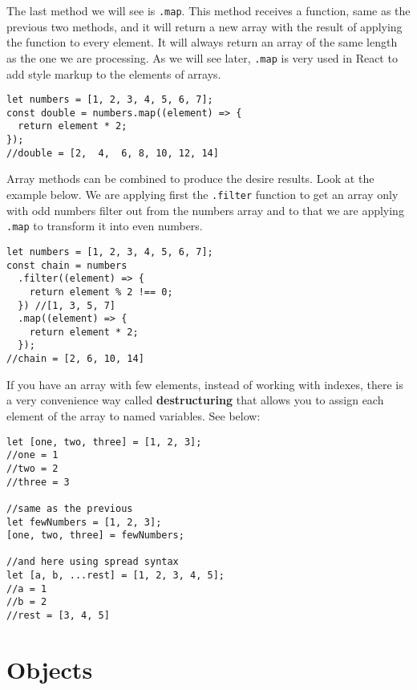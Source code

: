 \documentclass[a4paper, oneside, titlepage, 12pt]{book}
\begin{document}
The last method we will see is \texttt{.map}. This method receives a function, same as the previous two methods, and it will return a new array with the result of applying the function to every element. It will always return an array of the same length as the one we are processing. As we will see later, \texttt{.map} is very used in React to add style markup to the elements of arrays.

\begin{verbatim}
let numbers = [1, 2, 3, 4, 5, 6, 7];
const double = numbers.map((element) => {
  return element * 2;
});
//double = [2,  4,  6, 8, 10, 12, 14]
\end{verbatim}

Array methods can be combined to produce the desire results. Look at the example below. We are applying first the \texttt{.filter} function to get an array only with odd numbers filter out from the numbers array and to that we are applying \texttt{.map} to transform it into even numbers.

\begin{verbatim}
let numbers = [1, 2, 3, 4, 5, 6, 7];
const chain = numbers
  .filter((element) => {
    return element % 2 !== 0;
  }) //[1, 3, 5, 7]
  .map((element) => {
    return element * 2;
  });
//chain = [2, 6, 10, 14]
\end{verbatim}

If you have an array with few elements, instead of working with indexes, there is a very convenience way called \textbf{destructuring} that allows you to assign each element of the array to named variables. See below:

\begin{verbatim}
let [one, two, three] = [1, 2, 3];
//one = 1
//two = 2
//three = 3

//same as the previous
let fewNumbers = [1, 2, 3];
[one, two, three] = fewNumbers;

//and here using spread syntax
let [a, b, ...rest] = [1, 2, 3, 4, 5];
//a = 1
//b = 2
//rest = [3, 4, 5]
\end{verbatim}

\section{Objects}\label{jsobjects}
\end{document}
